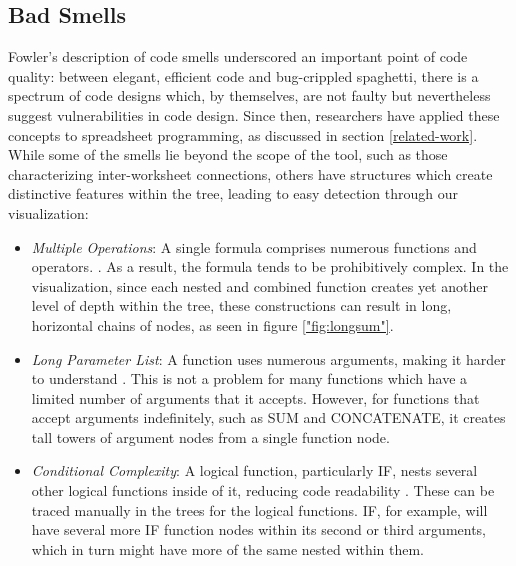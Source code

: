 \documentclass[conference]{IEEEtran}
\begin{document}
	\subsection{Bad Smells} \label{badsmells} Fowler's description of code smells
	\cite{fowler2009refactoring} underscored an important point of code quality:
	between elegant, efficient code and bug-crippled spaghetti, there is a spectrum
	of code designs which, by themselves, are not faulty but nevertheless suggest
	vulnerabilities in code design. Since then, researchers have applied these
	concepts to spreadsheet programming, as discussed in section
	\ref{related-work}. While some of the smells lie beyond the scope of the tool,
	such as those characterizing inter-worksheet connections, others have
	structures which create distinctive features within the tree, leading to easy
	detection through our visualization: \par
	
	\begin{itemize}
		
		\item \textit{Multiple Operations}: A single formula comprises numerous
		functions and operators. \cite{hermans2012detecting}. As a result, the formula
		tends to be prohibitively complex. In the visualization, since each nested and
		combined function creates yet another level of depth within the tree, these
		constructions can result in long, horizontal chains of nodes, as seen in
		figure \ref{"fig:longsum"}.
		
		\item \textit{Long Parameter List}: A function uses numerous arguments, making
		it harder to understand \cite{asavametha2012detecting}. This is not a problem
		for many functions which have a limited number of arguments that it accepts.
		However, for functions that accept arguments indefinitely, such as SUM and
		CONCATENATE, it creates tall towers of argument nodes from a single function
		node.
		
		\item \textit{Conditional Complexity}: A logical function, particularly IF,
		nests several other logical functions inside of it, reducing code readability
		\cite{hermans2012detecting}. These can be traced manually in the trees for the
		logical functions. IF, for example, will have several more IF function nodes
		within its second or third arguments, which in turn might have more of the
		same nested within them.
		
	\end{itemize}
	
\end{document}
